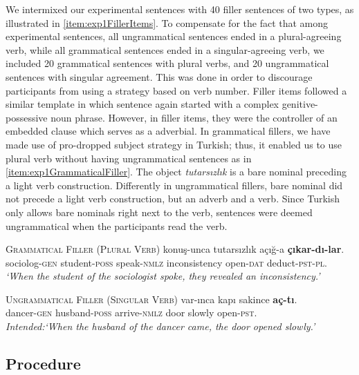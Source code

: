 \documentclass[
  english,
  doc,floatsintext]{apa6}
\begin{document}
We intermixed our experimental sentences with 40 filler sentences of two types, as illustrated in \ref{item:exp1FillerItems}.
To compensate for the fact that among experimental sentences, all ungrammatical sentences ended in a plural-agreeing verb, while all grammatical sentences ended in a singular-agreeing verb, we included 20 grammatical sentences with plural verbs, and 20 ungrammatical sentences with singular agreement.
This was done in order to discourage participants from using a strategy based on verb number.
Filler items followed a similar template in which sentence again started with a complex genitive-possessive noun phrase.
However, in filler items, they were the controller of an embedded clause which serves as a adverbial.
In grammatical fillers, we have made use of pro-dropped subject strategy in Turkish; thus, it enabled us to use plural verb without having ungrammatical sentences as in \ref{item:exp1GrammaticalFiller}. The object \textit{tutarsızlık} is a bare nominal preceding a light verb construction.
Differently in ungrammatical fillers, bare nominal did not precede a light verb construction, but an adverb and a verb. Since Turkish only allows bare nominals right next to the verb, sentences were deemed ungrammatical when the participants read the verb.

\begin{exe}
\ex \label{item:exp1FillerItems}
\begin{xlist}
\ex \textsc{Grammatical Filler (Plural Verb)} \label{item:exp1GrammaticalFiller}
 konuş-unca tutarsızlık açığ-a \textbf{çıkar-dı-lar}.\\ 
sociolog-\textsc{gen}  student-\textsc{poss} speak-\textsc{nmlz} inconsistency  open-\textsc{dat} deduct-\textsc{pst}-\textsc{pl}.\\
\glt \textit{`When the student of the sociologist spoke, they revealed an inconsistency.'}

\ex \textsc{Ungrammatical Filler (Singular Verb)}
 var-ınca kapı sakince \textbf{aç-tı}. \\
dancer-\textsc{gen}  husband-\textsc{poss} arrive-\textsc{nmlz} door slowly  open-\textsc{pst}.\\
\glt \textit{Intended:`When the husband of the dancer came, the door opened slowly.'}
\end{xlist}
\end{exe}

\hypertarget{procedure}{%
\subsection{Procedure}\label{procedure}}
\end{document}
